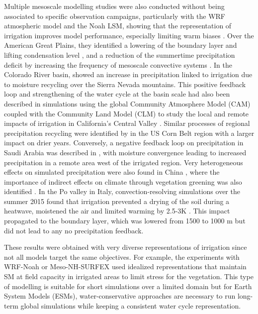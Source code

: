 Multiple mesoscale modelling studies were also conducted without being associated to specific observation campaigns, particularly with the WRF atmospheric model and the Noah LSM, showing that the representation of irrigation improves model performance, especially limiting warm biases \citep{qian_modeling_2013, yang_impact_2017,qian_neglecting_2020, liu_simulating_2021}. Over the American Great Plains, they identified a lowering of the boundary layer and lifting condensation level \citep{qian_modeling_2013}, and a reduction of the summertime precipitation deficit by increasing the frequency of mesoscale convective systems \citep{qian_neglecting_2020}. In the Colorado River basin, \citet{yang_impact_2017} showed an increase in precipitation linked to irrigation due to moisture recycling over the Sierra Nevada mountains. This positive feedback loop and strengthening of the water cycle at the basin scale had also been described in simulations using the global Community Atmosphere Model (CAM) coupled with the Community Land Model (CLM) to study the local and remote impacts of irrigation in California's Central Valley \citep{lo_irrigation_2013}. 
Similar processes of regional precipitation recycling were identified by \citet{zhang_us_2025} in the US Corn Belt region with a larger impact on drier years.
Conversely, a negative feedback loop on precipitation in Saudi Arabia was described in \citep{lo_intense_2021}, with moisture convergence leading to increased precipitation in a remote area west of the irrigated region. Very heterogeneous effects on simulated precipitation were also found in China \citep{liu_simulating_2021}, where the importance of indirect effects on climate through vegetation greening was also identified \citep{liu_irrigation-induced_2023}. In the Po valley in Italy, convection-resolving simulations over the summer 2015 found that irrigation prevented a drying of the soil during a heatwave, moistened the air and limited warming by 2.5-3K \citep{valmassoi_regional_2020}. This impact propagated to the boundary layer, which was lowered from 1500 to 1000 m but did not lead to any no precipitation feedback.

These results were obtained with very diverse representations of irrigation since not all models target the same objectives. For example, the experiments with WRF-Noah or Meso-NH-SURFEX \citep{lunel_irrigation_2024} used idealized representations that maintain SM at field capacity in irrigated areas to limit stress for the vegetation. This type of modelling is suitable for short simulations over a limited domain but for Earth System Models (ESMs), water-conservative approaches are necessary to run long-term global simulations while keeping a consistent water cycle representation. 

